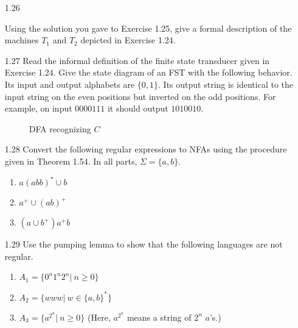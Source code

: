 \begin{enumerate}

    \item [1.26]

          Using the solution you gave to Exercise 1.25, give a formal description of the machines $T_1$ and $T_2$ depicted in Exercise 1.24.

    \item [1.27]
          Read the informal definition of the finite state transducer given in Exercise 1.24. Give the state diagram of an FST with the following behavior. Its input and output alphabets are $\{0,1\}$. Its output string is identical to the input string on the even positions but inverted on the odd positions. For example, on input $0000111$ it should output $1010010$.

          \begin{figure}[H]
              \centering
              \caption{DFA recognizing $C$}
          \end{figure}

    \item [1.28]
          Convert the following regular expressions to NFAs using the procedure given in Theorem 1.54. In all parts, $\Sigma=\{a,b\}$. \begin{enumerate}
              \item $a(abb)^\ast \cup b$
              \item $a^+ \cup (ab)^+$
              \item $(a \cup b^+)a^+b$
          \end{enumerate}
    \item [1.29]
          Use the pumping lemma to show that the following languages are not regular.
          \begin{enumerate}
              \item $A_1 =\{0^n 1^n 2^n | ~n \geq 0\}$
              \item $A_2 =\{www|~w \in \{a,b\}^\ast\}$
              \item $A_3 = \{ a^{2^n} | ~n \geq 0\}$  (Here, $a^{2^n}$ means a string of $2^n$ $a$’s.)
          \end{enumerate}


\end{enumerate}
